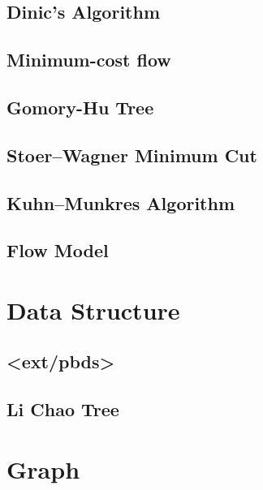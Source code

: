 \documentclass[a4paper,10pt,twocolumn,oneside]{article}
\begin{document}
\subsection{Dinic's Algorithm}

% 
\subsection{Minimum-cost flow}

\subsection{Gomory-Hu Tree}

\subsection{Stoer–Wagner Minimum Cut}

\subsection{Kuhn–Munkres Algorithm}

\subsection{Flow Model}

\section{Data Structure}
% 
\subsection{<ext/pbds>}

\subsection{Li Chao Tree}

\section{Graph}
\end{document}
